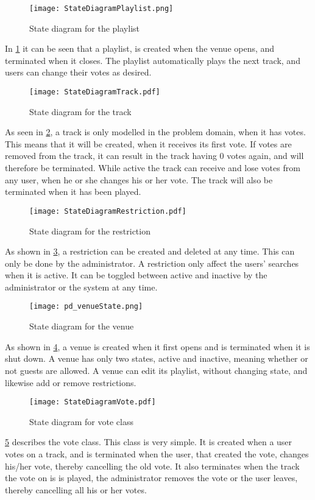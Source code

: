 \begin{figure}[H]
  \centering
  \texttt{[image: StateDiagramPlaylist.png]}
  \caption{State diagram for the playlist}\label{fig:StateDiagramPlaylist}
\end{figure}

In \cref{fig:StateDiagramPlaylist} it can be seen that a playlist, is created when the venue opens, and terminated when it closes. The playlist automatically plays the next track, and users can change their votes as desired.

\begin{figure}[H]
  \centering
  \texttt{[image: StateDiagramTrack.pdf]}
  \caption{State diagram for the track}\label{fig:StateDiagramTrack}
\end{figure}

As seen in \cref{fig:StateDiagramTrack}, a track is only modelled in the problem domain, when it has votes. This means that it will be created, when it receives its first vote. If votes are removed from the track, it can result in the track having 0 votes again, and will therefore be terminated. While active the track can receive and lose votes from any user, when he or she changes his or her vote. The track will also be terminated when it has been played.

\begin{figure}[H]
  \centering
  \texttt{[image: StateDiagramRestriction.pdf]}
  \caption{State diagram for the restriction}\label{fig:StateDiagramRestriction}
\end{figure}

As shown in \cref{fig:StateDiagramRestriction}, a restriction can be created and deleted at any time. This can only be done by the administrator. A restriction only affect the users' searches when it is active. It can be toggled between active and inactive by the administrator or the system at any time.

\begin{figure}[H]
  \centering
  \texttt{[image: pd\_venueState.png]}
  \caption{State diagram for the venue}\label{fig:StateDiagramVenue}
\end{figure}

As shown in \cref{fig:StateDiagramVenue}, a venue is created when it first opens and is terminated when it is shut down. A venue has only two states, active and inactive, meaning whether or not guests are allowed. A venue can edit its playlist, without changing state, and likewise add or remove restrictions.

\begin{figure}[H]
  \centering
  \texttt{[image: StateDiagramVote.pdf]}
  \caption{State diagram for vote class}\label{fig:StateDiagramVote}
\end{figure}

\cref{fig:StateDiagramVote} describes the vote class. This class is very simple. It is created when a user votes on a track, and is terminated when the user, that created the vote, changes his/her vote, thereby cancelling the old vote. It also terminates when the track the vote on is is played, the administrator removes the vote or the user leaves, thereby cancelling all his or her votes.